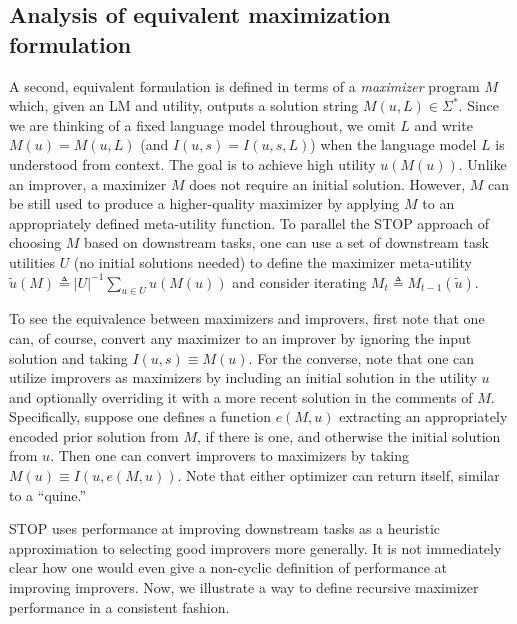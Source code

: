 \documentclass{article}
\newcommand{\maxutil}{{\tilde{u}}}
\newcommand{\sol}{{s}}
\newcommand{\defeq}{\triangleq}
\begin{document}
\subsection{Analysis of equivalent maximization formulation}\label{sec:max}



A second, equivalent formulation is defined in terms of a \emph{maximizer} program $M$ which, given an LM and utility, outputs a solution string $M(u, L) \in \Sigma^*$. Since we are thinking of a fixed language model throughout, we omit $L$ and write $M(u) = M(u, L)$ (and $I(u, \sol) = I(u, \sol, L)$) when the language model $L$ is understood from context. The goal is to achieve high utility $u(M(u))$. 
Unlike an improver, a maximizer $M$ does not require an initial solution. However, $M$ can be still used to produce a higher-quality maximizer by applying $M$ to an appropriately defined meta-utility function.  To parallel the STOP  approach of choosing $M$ based on downstream tasks, one can use a set of downstream task utilities $U$ (no initial solutions needed) 
to define the maximizer meta-utility
$\maxutil(M)\defeq |U|^{-1}\sum_{u\in U}u(M(u))$ 
and consider iterating $M_t\defeq M_{t-1}(\maxutil).$ 

To see the equivalence between maximizers and improvers, first note that one can, of course, convert any maximizer to an improver by ignoring the input solution and taking $I(u, \sol)\equiv M(u)$. For the converse, note that one can utilize improvers as maximizers by including an initial solution in the utility $u$ and optionally overriding it with a more recent solution in the comments of $M$. Specifically, suppose one defines a function $e(M, u)$ extracting an appropriately encoded prior solution from $M$, if there is one, and otherwise the initial solution from $u$. Then one can convert improvers to maximizers by taking $M(u) \equiv I(u, e(M, u))$. Note that either optimizer can return itself, similar to a ``quine.'' 



STOP uses performance at improving downstream tasks as a heuristic approximation to selecting good improvers more generally. It is not immediately clear how one would even give a non-cyclic definition of performance at improving improvers. Now, we illustrate a way to define recursive maximizer performance in a consistent fashion. 
\end{document}
